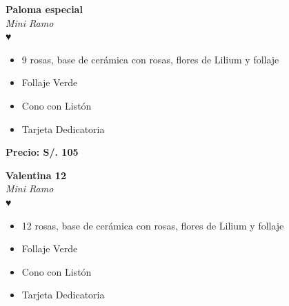 \documentclass{article}
\begin{document}
\begin{minipage}{0.6\textwidth}
    \textcolor{cpred}{\textbf{\huge Paloma especial }}\\
    {\textit{Mini Ramo}} \\
    \textcolor{cpred}{\Huge ♥} \\
    \vspace{0.5cm}
    \begin{itemize}
        \item 9 rosas, base de cerámica con rosas, flores de Lilium y follaje
        \item Follaje Verde
        \item Cono con Listón
        \item Tarjeta Dedicatoria
    \end{itemize}
\end{minipage}
\vspace{0.3cm}
\begin{center}
   \textbf{\Large Precio: \textcolor{cpred}{S/. 105 }}
\end{center}
\vspace{1cm}
\noindent
\begin{minipage}{0.6\textwidth}
    \textcolor{cpred}{\textbf{\huge Valentina 12 }}\\
    {\textit{Mini Ramo}} \\
    \textcolor{cpred}{\Huge ♥} \\
    \vspace{0.5cm}
    \begin{itemize}
        \item 12 rosas, base de cerámica con rosas, flores de Lilium y follaje
        \item Follaje Verde
        \item Cono con Listón
        \item Tarjeta Dedicatoria
    \end{itemize}
\end{minipage}
\hspace{1cm}
\end{document}
